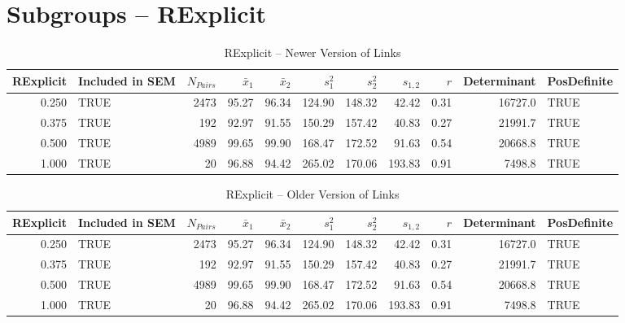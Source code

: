 \documentclass{article}\usepackage[]{graphicx}\usepackage[]{color}
\begin{document}
\section{Subgroups --  RExplicit }%
\begin{table}[ht]
\centering
\begin{tabular}{rlrrrrrrrrl}
  \hline
RExplicit & Included in SEM & $N_{Pairs}$ & $\bar{x}_1$ & $\bar{x}_2$ & $s_1^2$ & $s_2^2$ & $s_{1,2}$ & $r$ & Determinant & PosDefinite \\ 
  \hline
0.250 & TRUE & 2473 & 95.27 & 96.34 & 124.90 & 148.32 & 42.42 & 0.31 & 16727.0 & TRUE \\ 
  0.375 & TRUE & 192 & 92.97 & 91.55 & 150.29 & 157.42 & 40.83 & 0.27 & 21991.7 & TRUE \\ 
  0.500 & TRUE & 4989 & 99.65 & 99.90 & 168.47 & 172.52 & 91.63 & 0.54 & 20668.8 & TRUE \\ 
  1.000 & TRUE & 20 & 96.88 & 94.42 & 265.02 & 170.06 & 193.83 & 0.91 & 7498.8 & TRUE \\ 
   \hline
\end{tabular}
\caption{RExplicit -- Newer Version of Links} 
\end{table}
\begin{table}[ht]
\centering
\begin{tabular}{rlrrrrrrrrl}
  \hline
RExplicit & Included in SEM & $N_{Pairs}$ & $\bar{x}_1$ & $\bar{x}_2$ & $s_1^2$ & $s_2^2$ & $s_{1,2}$ & $r$ & Determinant & PosDefinite \\ 
  \hline
0.250 & TRUE & 2473 & 95.27 & 96.34 & 124.90 & 148.32 & 42.42 & 0.31 & 16727.0 & TRUE \\ 
  0.375 & TRUE & 192 & 92.97 & 91.55 & 150.29 & 157.42 & 40.83 & 0.27 & 21991.7 & TRUE \\ 
  0.500 & TRUE & 4989 & 99.65 & 99.90 & 168.47 & 172.52 & 91.63 & 0.54 & 20668.8 & TRUE \\ 
  1.000 & TRUE & 20 & 96.88 & 94.42 & 265.02 & 170.06 & 193.83 & 0.91 & 7498.8 & TRUE \\ 
   \hline
\end{tabular}
\caption{RExplicit -- Older Version of Links} 
\end{table}
\newpage 
\end{document}
